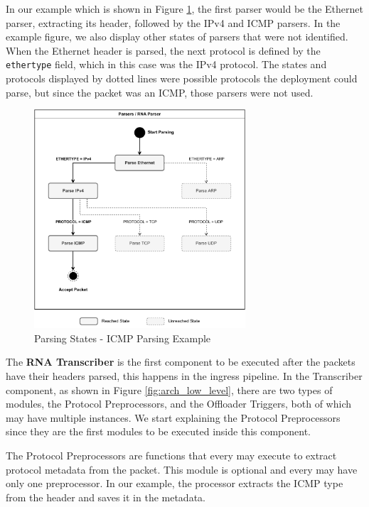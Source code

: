 In our example which is shown in Figure \ref{fig:icmp_ex_parser}, the first parser would be the Ethernet parser, extracting its header, followed by the IPv4 and ICMP parsers. In the example figure, we also display other states of parsers that were not identified. When the Ethernet header is parsed, the next protocol is defined by the \texttt{ethertype} field, which in this case was the IPv4 protocol. The states and protocols displayed by dotted lines were possible protocols the deployment could parse, but since the packet was an ICMP, those parsers were not used.

\begin{figure}[ht]
    \caption{Parsing States - ICMP Parsing Example}
    \begin{center}
        \includegraphics[width=0.7\textwidth]{images/icmp_ex_parser.pdf}  
    \end{center}
    \label{fig:icmp_ex_parser}
\end{figure}



The \textbf{RNA Transcriber} is the first component to be executed after the packets have their headers parsed, this happens in the ingress pipeline. In the Transcriber component, as shown in Figure \ref{fig:arch_low_level}, there are two types of modules, the Protocol Preprocessors, and the Offloader Triggers, both of which may have multiple instances. We start explaining the Protocol Preprocessors since they are the first modules to be executed inside this component.

The Protocol Preprocessors are functions that every \ProtocolTemplate{} may execute to extract protocol metadata from the packet. This module is optional and every \ProtocolTemplate{} may have only one preprocessor. In our example, the processor extracts the ICMP type from the header and saves it in the metadata.

